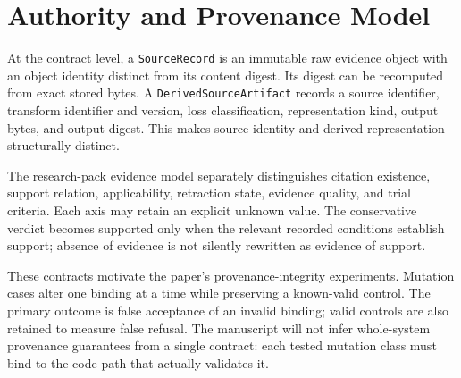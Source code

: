 \section{Authority and Provenance Model}

At the contract level, a \texttt{SourceRecord} is an immutable raw evidence object with an object identity distinct from its content digest. Its digest can be recomputed from exact stored bytes. A \texttt{DerivedSourceArtifact} records a source identifier, transform identifier and version, loss classification, representation kind, output bytes, and output digest. This makes source identity and derived representation structurally distinct.

The research-pack evidence model separately distinguishes citation existence, support relation, applicability, retraction state, evidence quality, and trial criteria. Each axis may retain an explicit unknown value. The conservative verdict becomes supported only when the relevant recorded conditions establish support; absence of evidence is not silently rewritten as evidence of support.

These contracts motivate the paper's provenance-integrity experiments. Mutation cases alter one binding at a time while preserving a known-valid control. The primary outcome is false acceptance of an invalid binding; valid controls are also retained to measure false refusal. The manuscript will not infer whole-system provenance guarantees from a single contract: each tested mutation class must bind to the code path that actually validates it.
